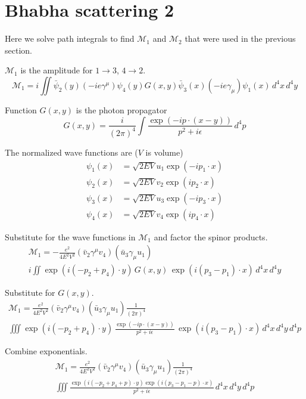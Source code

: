 

\section*{Bhabha scattering 2}

Here we solve path integrals to find $\mathcal M_1$ and $\mathcal M_2$
that were used in the previous section.

\bigskip
$\mathcal M_1$ is the amplitude for $1\rightarrow3$, $4\rightarrow2$.
\begin{equation*}
\mathcal M_1=i\iint
\bar\psi_2(y)
(-ie\gamma^\mu)
\psi_4(y)
G(x,y)
\bar\psi_3(x)
(-ie\gamma_\mu)
\psi_1(x)
\,d^4x\,d^4y
\end{equation*}

Function $G(x,y)$ is the photon propagator
\begin{equation*}
G(x,y)=\frac{i}{(2\pi)^4}\int\frac{\exp(-ip\cdot(x-y))}{p^2+i\epsilon}\,d^4p
\end{equation*}

The normalized wave functions are ($V$ is volume)
\begin{align*}
\psi_1(x)&=\sqrt{2EV}u_1\exp(-ip_1\cdot x)
\\
\psi_2(x)&=\sqrt{2EV}v_2\exp(ip_2\cdot x)
\\
\psi_3(x)&=\sqrt{2EV}u_3\exp(-ip_3\cdot x)
\\
\psi_4(x)&=\sqrt{2EV}v_4\exp(ip_4\cdot x)
\end{align*}

Substitute for the wave functions in $\mathcal M_1$ and factor the spinor products.
\begin{multline*}
\mathcal M_1=-\frac{e^2}{4E^2V^2}(\bar v_2\gamma^\mu v_4)(\bar u_3\gamma_\mu u_1)
\\
i\iint
{\exp(i(-p_2+p_4)\cdot y)}
\,G(x,y)\,
{\exp(i(p_3-p_1)\cdot x)}
\,d^4x\,d^4y
\end{multline*}

Substitute for $G(x,y)$.
\begin{multline*}
\mathcal M_1=\frac{e^2}{4E^2V^2}(\bar v_2\gamma^\mu v_4)(\bar u_3\gamma_\mu u_1)
\frac{1}{(2\pi)^4}
\\
\iiint
{\exp(i(-p_2+p_4)\cdot y)}
\,{\frac{\exp(-ip\cdot(x-y))}{p^2+i\epsilon}}\,
{\exp(i(p_3-p_1)\cdot x)}
\,d^4x\,d^4y\,d^4p
\end{multline*}

Combine exponentials.
\begin{multline*}
\mathcal M_1=\frac{e^2}{4E^2V^2}(\bar v_2\gamma^\mu v_4)(\bar u_3\gamma_\mu u_1)
\frac{1}{(2\pi)^4}
\\
\iiint
\frac{\exp(i(-p_2+p_4+p)\cdot y)\exp(i(p_3-p_1-p)\cdot x)}{p^2+i\epsilon}
\,d^4x\,d^4y\,d^4p
\end{multline*}

